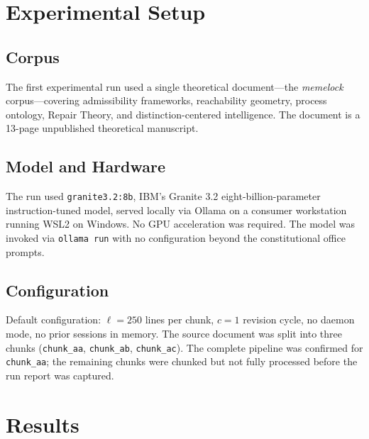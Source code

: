 \documentclass[12pt, a4paper]{article}
\theoremstyle{principle}
\theoremstyle{definition}
\begin{document}
\section{Experimental Setup}
\label{sec:experiment}

\subsection{Corpus}

The first experimental run used a single theoretical document---the
\emph{memelock} corpus---covering admissibility frameworks, reachability geometry,
process ontology, Repair Theory, and distinction-centered intelligence. The document
is a 13-page unpublished theoretical manuscript.

\subsection{Model and Hardware}

The run used \texttt{granite3.2:8b}, IBM's Granite 3.2 eight-billion-parameter
instruction-tuned model, served locally via Ollama on a consumer workstation running
WSL2 on Windows. No GPU acceleration was required. The model was invoked via
\texttt{ollama run} with no configuration beyond the constitutional office prompts.

\subsection{Configuration}

Default configuration: $\ell = 250$ lines per chunk, $c = 1$ revision cycle,
no daemon mode, no prior sessions in memory. The source document was split into
three chunks (\texttt{chunk\_aa}, \texttt{chunk\_ab}, \texttt{chunk\_ac}).
The complete pipeline was confirmed for \texttt{chunk\_aa}; the remaining chunks
were chunked but not fully processed before the run report was captured.

\section{Results}
\label{sec:results}
\end{document}
